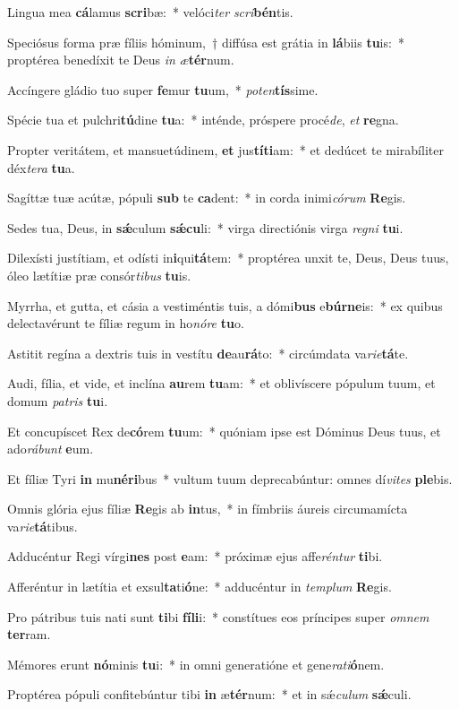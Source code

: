 \item Lingua mea \textbf{cá}lamus \textbf{scri}bæ:~* velóci\textit{ter} \textit{scri}\textbf{bén}tis.
\item Speciósus forma præ fíliis hóminum,~† diffúsa est grátia in \textbf{lá}biis \textbf{tu}is:~* proptérea benedíxit te Deus \textit{in} \textit{æ}\textbf{tér}num.
\item Accíngere gládio tuo super \textbf{fe}mur \textbf{tu}um,~* \textit{pot}\textit{en}\textbf{tís}sime.
\item Spécie tua et pulchri\textbf{tú}dine \textbf{tu}a:~* inténde, próspere procé\textit{de}, \textit{et} \textbf{re}gna.
\item Propter veritátem, et mansuetúdinem, \textbf{et} jus\textbf{tí}\textbf{ti}am:~* et dedúcet te mirabíliter déx\textit{te}\textit{ra} \textbf{tu}a.
\item Sagíttæ tuæ acútæ, pópuli \textbf{sub} te \textbf{ca}dent:~* in corda inimi\textit{có}\textit{rum} \textbf{Re}gis.
\item Sedes tua, Deus, in \textbf{sǽ}culum \textbf{sǽ}\textbf{cu}li:~* virga directiónis virga \textit{re}\textit{gni} \textbf{tu}i.
\item Dilexísti justítiam, et odísti in\textbf{i}qui\textbf{tá}tem:~* proptérea unxit te, Deus, Deus tuus, óleo lætítiæ præ consór\textit{ti}\textit{bus} \textbf{tu}is.
\item Myrrha, et gutta, et cásia a vestiméntis tuis, a dómi\textbf{bus} e\textbf{búr}\textbf{ne}is:~* ex quibus delectavérunt te fíliæ regum in ho\textit{nó}\textit{re} \textbf{tu}o.
\item Astitit regína a dextris tuis in vestítu \textbf{de}au\textbf{rá}to:~* circúmdata va\textit{ri}\textit{e}\textbf{tá}te.
\item Audi, fília, et vide, et inclína \textbf{au}rem \textbf{tu}am:~* et oblivíscere pópulum tuum, et domum \textit{pa}\textit{tris} \textbf{tu}i.
\item Et concupíscet Rex de\textbf{có}rem \textbf{tu}um:~* quóniam ipse est Dóminus Deus tuus, et ado\textit{rá}\textit{bunt} \textbf{e}um.
\item Et fíliæ Tyri \textbf{in} mu\textbf{né}\textbf{ri}bus~* vultum tuum deprecabúntur: omnes dí\textit{vi}\textit{tes} \textbf{ple}bis.
\item Omnis glória ejus fíliæ \textbf{Re}gis ab \textbf{in}tus,~* in fímbriis áureis circumamícta va\textit{ri}\textit{e}\textbf{tá}tibus.
\item Adducéntur Regi vírgi\textbf{nes} post \textbf{e}am:~* próximæ ejus affe\textit{rén}\textit{tur} \textbf{ti}bi.
\item Afferéntur in lætítia et exsul\textbf{ta}ti\textbf{ó}ne:~* adducéntur in \textit{tem}\textit{plum} \textbf{Re}gis.
\item Pro pátribus tuis nati sunt \textbf{ti}bi \textbf{fí}\textbf{li}i:~* constítues eos príncipes super \textit{om}\textit{nem} \textbf{ter}ram.
\item Mémores erunt \textbf{nó}minis \textbf{tu}i:~* in omni generatióne et gene\textit{ra}\textit{ti}\textbf{ó}nem.
\item Proptérea pópuli confitebúntur tibi \textbf{in} æ\textbf{tér}num:~* et in sǽ\textit{cu}\textit{lum} \textbf{sǽ}culi.
